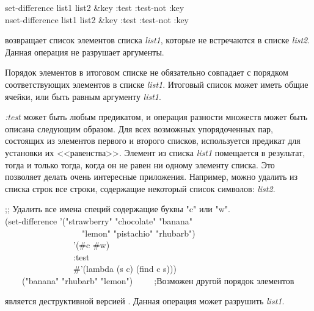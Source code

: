 \begin{defun}[Функция]
set-difference list1 list2 &key :test :test-not :key \\
nset-difference list1 list2 &key :test :test-not :key

 возвращает список элементов списка \emph{list1}, которые не
встречаются в списке \emph{list2}. Данная операция не разрушает аргументы.

Порядок элементов в итоговом списке не обязательно совпадает с порядком
соответствующих элементов в списке \emph{list1}.
Итоговый список может иметь общие ячейки, или быть равным  аргументу
\emph{list1}.

\emph{:test} может быть любым предикатом, и операция разности множеств может
быть описана следующим образом. Для всех возможных упорядоченных пар,
состоящих из элементов первого и второго списков, используется предикат для
установки их <<равенства>>. Элемент из списка \emph{list1} помещается в
результат, тогда и только тогда, когда он не равен ни одному элементу списка. Это
позволяет делать очень интересные приложения.
Например, можно удалить из списка строк все строки, содержащие некоторый список символов:
\emph{list2}.
\begin{lisp}
;; Удалить все имена специй содержащие буквы "c" или "w". \\
(set-difference '("strawberry" "chocolate" "banana" \\
~~~~~~~~~~~~~~~~~~"lemon" "pistachio" "rhubarb") \\
~~~~~~~~~~~~~~~~'(\#{\Xbackslash}c \#{\Xbackslash}w) \\
~~~~~~~~~~~~~~~~:test \\
~~~~~~~~~~~~~~~~\#'(lambda (s c) (find c s))) \\
~~~\EV\ ("banana" "rhubarb" "lemon")~~~~~;\textrm{Возможен другой порядок
  элементов}
\end{lisp}

 является деструктивной версией
. Данная операция может разрушить \emph{list1}.
\end{defun}

